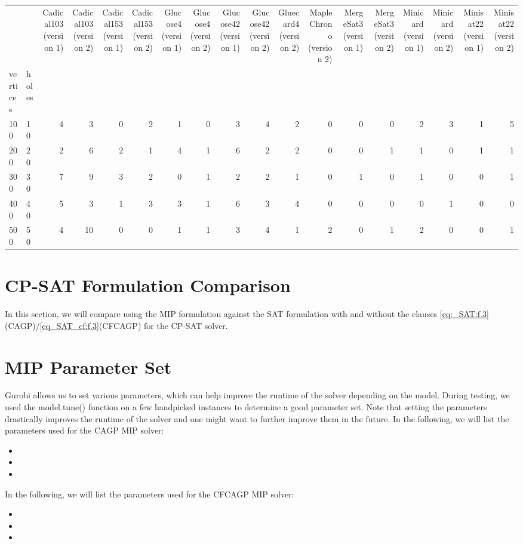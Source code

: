 \begin{tabular}{llrrrrrrrrrrrrrrrr}
\toprule
 &  & Cadical103 (version 1) & Cadical103 (version 2) & Cadical153 (version 1) & Cadical153 (version 2) & Glucose4 (version 1) & Glucose4 (version 2) & Glucose42 (version 1) & Glucose42 (version 2) & Gluecard4 (version 2) & MapleChrono (version 2) & MergeSat3 (version 1) & MergeSat3 (version 2) & Minicard (version 1) & Minicard (version 2) & Minisat22 (version 1) & Minisat22 (version 2) \\
vertices & holes &  &  &  &  &  &  &  &  &  &  &  &  &  &  &  &  \\
\midrule
100 & 10 & 4 & 3 & 0 & 2 & 1 & 0 & 3 & 4 & 2 & 0 & 0 & 0 & 2 & 3 & 1 & 5 \\
\cline{1-18}
200 & 20 & 2 & 6 & 2 & 1 & 4 & 1 & 6 & 2 & 2 & 0 & 0 & 1 & 1 & 0 & 1 & 1 \\
\cline{1-18}
300 & 30 & 7 & 9 & 3 & 2 & 0 & 1 & 2 & 2 & 1 & 0 & 1 & 0 & 1 & 0 & 0 & 1 \\
\cline{1-18}
400 & 40 & 5 & 3 & 1 & 3 & 3 & 1 & 6 & 3 & 4 & 0 & 0 & 0 & 0 & 1 & 0 & 0 \\
\cline{1-18}
500 & 50 & 4 & 10 & 0 & 0 & 1 & 1 & 3 & 4 & 1 & 2 & 0 & 1 & 2 & 0 & 0 & 1 \\
\cline{1-18}
\bottomrule
\end{tabular}


\section{CP-SAT Formulation Comparison}
In this section, we will compare using the MIP formulation against the SAT formulation with and without the clauses \cref{eq:_SAT:f.3}(CAGP)/\cref{eq_SAT_cf:f.3}(CFCAGP) for the CP-SAT solver. 

\section{MIP Parameter Set}
Gurobi allows us to set various parameters, which can help improve the runtime of the solver depending on the model. During testing, we used the model.tune() function on a few handpicked instances to determine a good parameter set. Note that setting the parameters drastically improves the runtime of the solver and one might want to further improve them in the future. In the following, we will list the parameters used for the CAGP MIP solver:
\begin{itemize}
  \item 
  \item 
  \item 
\end{itemize}
In the following, we will list the parameters used for the CFCAGP MIP solver:
\begin{itemize}
  \item 
  \item 
  \item 
\end{itemize}

